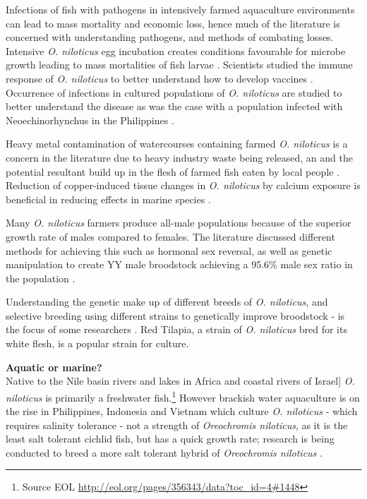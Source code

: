 \documentclass[openany]{book}
\let\rmarkdownfootnote\footnote%
\def\footnote{\protect\rmarkdownfootnote}
\theoremstyle{definition}
\theoremstyle{definition}
\theoremstyle{definition}
\theoremstyle{remark}
\begin{document}
Infections of fish with pathogens in intensively farmed aquaculture
environments can lead to mass mortality and economic loss, hence much of
the literature is concerned with understanding pathogens, and methods of
combating losses. Intensive \emph{O. niloticus} egg incubation creates
conditions favourable for microbe growth leading to mass mortalities of
fish larvae \citep{Jantrakajorn_2016}. Scientists studied the immune
response of \emph{O. niloticus} to better understand how to develop
vaccines \citep{Kuendee_2015}. Occurrence of infections in cultured
populations of \emph{O. niloticus} are studied to better understand the
disease as was the case with a population infected with
Neoechinorhynchus in the Philippines \citep{de_la_Cruz_2012}.

Heavy metal contamination of watercourses containing farmed \emph{O.
niloticus} is a concern in the literature due to heavy industry waste
being released, an and the potential resultant build up in the flesh of
farmed fish eaten by local people \citep{Baharom_2015, Marcussen_2007}.
Reduction of copper-induced tissue changes in \emph{O. niloticus} by
calcium exposure is beneficial in reducing effects in marine species
\citep{Kosai_2009}.

Many \emph{O. niloticus} farmers produce all-male populations because of
the superior growth rate of males compared to females. The literature
discussed different methods for achieving this such as hormonal sex
reversal, as well as genetic manipulation to create YY male broodstock
achieving a 95.6\% male sex ratio in the population
\citep{Guerrero_2008, Mair_1997}.

Understanding the genetic make up of different breeds of \emph{O.
niloticus}, and selective breeding using different strains to
genetically improve broodstock - is the focus of some researchers
\citep{Supiwong_2013, Bentsen_1998}. Red Tilapia, a strain of \emph{O.
niloticus} bred for its white flesh, is a popular strain for culture.

\textbf{Aquatic or marine?}\\
Native to the Nile basin rivers and lakes in Africa and coastal rivers
of Israel{]} \emph{O. niloticus} is primarily a freshwater
fish.\footnote{Source EOL
  \url{http://eol.org/pages/356343/data?toc_id=4\#1448}} However
brackish water aquaculture is on the rise in Philippines, Indonesia and
Vietnam which culture \emph{O. niloticus} - which requires salinity
tolerance - not a strength of \emph{Oreochromis niloticus}, as it is the
least salt tolerant cichlid fish, but has a quick growth rate; research
is being conducted to breed a more salt tolerant hybrid of
\emph{Oreochromis niloticus} \citep{Kamal_2005}.
\end{document}

